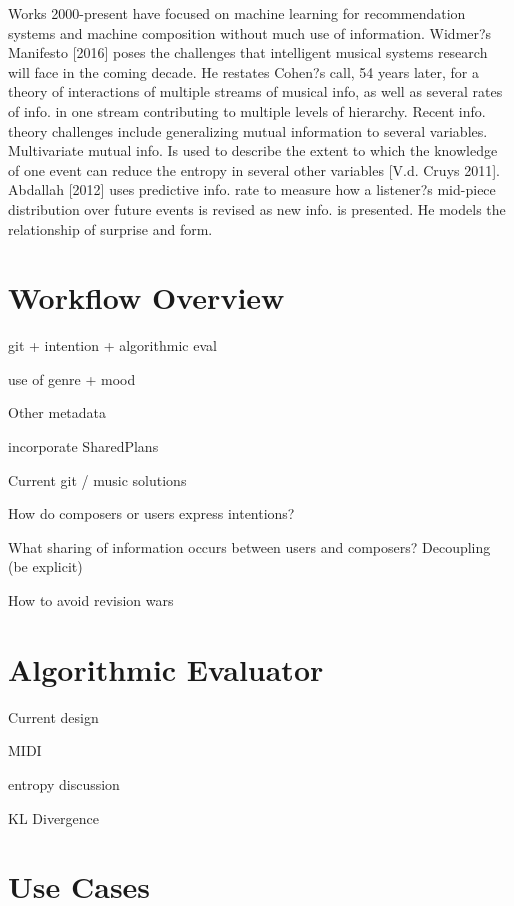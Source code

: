 \documentclass[final,authoryear,11pt,times]{elsarticle}
\begin{document}
Works 2000-present have focused on machine learning for recommendation systems and machine composition without much use of information. Widmer?s Manifesto [2016] poses the challenges that intelligent musical systems research will face in the coming decade. He restates Cohen?s call, 54 years later, for a theory of interactions of multiple streams of musical info, as well as several rates of info. in one stream contributing to multiple levels of hierarchy. Recent info. theory challenges include generalizing mutual information to several variables. Multivariate mutual info. Is used to describe the extent to which the knowledge of one event can reduce the entropy in several other variables [V.d. Cruys 2011]. Abdallah [2012] uses predictive info. rate to measure how a listener?s mid-piece distribution over future events is revised as new info. is presented. He models the relationship of surprise and form.
















\section{Workflow Overview}

git + intention + algorithmic eval

use of genre + mood

Other metadata

incorporate SharedPlans

Current git / music solutions

How do composers or users express intentions?

What sharing of information occurs between users and composers? Decoupling (be explicit)

How to avoid revision wars

\section{Algorithmic Evaluator}

Current design

MIDI

entropy discussion

KL Divergence

\section{Use Cases}
\end{document}
